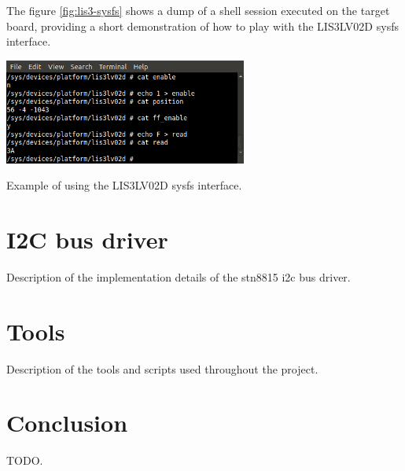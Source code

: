\documentclass[a4paper,10pt]{article}
\makeatletter
\newenvironment{figurehere}{\def\@captype{figure}\vspace{2ex}}{\vspace{2ex}}
\makeatother
\begin{document}
\begin{multicols}{2}
The figure \ref{fig:lis3-sysfs} shows a
dump of a shell session executed on the target board, providing a short
demonstration of how to play with the LIS3LV02D sysfs interface.

\begin{figurehere}
 \centering
 \includegraphics[width=8cm, height=3.46cm]{./figures/lis3lv02d-sysfs.png}
 \caption{Example of using the LIS3LV02D sysfs interface.}
 \label{fig:lis3-sysfs}
\end{figurehere}



\section{I2C bus driver}
\label{sec:i2c_bus_driver}

Description of the implementation details of the stn8815 i2c bus driver.



\section{Tools}
\label{sec:tools}

Description of the tools and scripts used throughout the project.



\section{Conclusion}

TODO.







\end{multicols}
\end{document}
